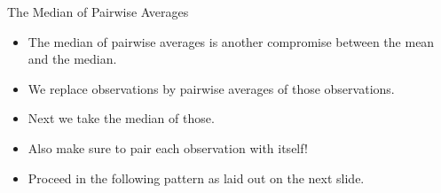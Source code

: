 \documentclass[14pt]{beamer}\usepackage[]{graphicx}\usepackage[]{color}
\begin{document}
\begin{frame}[fragile]{The Median of Pairwise Averages}

\begin{itemize}
\item The median of pairwise averages is another  compromise between the mean and the median.
\item We replace observations by pairwise averages of  those observations.
\item Next we take the median of those.
\item Also make sure to pair each observation with  itself!
\item Proceed in the following pattern as laid out on the  next slide.
\end{itemize}
\end{frame}
\end{document}
